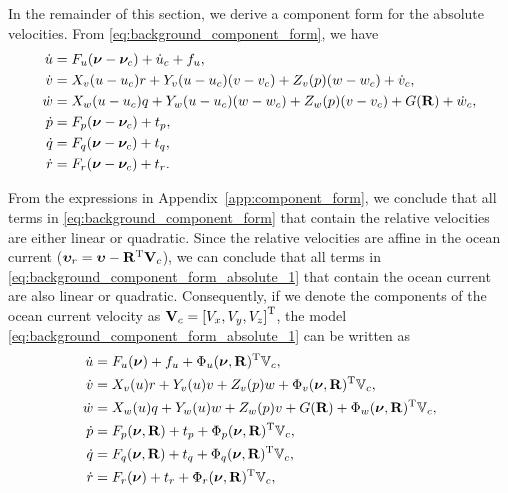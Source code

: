 In the remainder of this section, we derive a component form for the absolute velocities.
From \eqref{eq:background_component_form}, we have
\begin{subequations}
    \begin{align}
        \dot{u} &= F_u(\bm{\nu} - \bm{\nu}_c) + \dot{u}_c + f_u, \\
        \dot{v} &= X_v(u - u_c)r + Y_v(u - u_c)(v - v_c) + Z_v(p)(w - w_c) + \dot{v}_c, \\
        \dot{w} &= X_w(u - u_c)q + Y_w(u - u_c)(w - w_c) + Z_w(p)(v - v_c) + G(\mathbf{R}) + \dot{w}_c, \\
        \dot{p} &= F_p(\bm{\nu} - \bm{\nu}_c) + t_p, \\
        \dot{q} &= F_q(\bm{\nu} - \bm{\nu}_c) + t_q, \\
        \dot{r} &= F_r(\bm{\nu} - \bm{\nu}_c) + t_r.
    \end{align}
    \label{eq:background_component_form_absolute_1}
\end{subequations}%

From the expressions in Appendix~\ref{app:component_form}, we conclude that all terms in \eqref{eq:background_component_form} that contain the relative velocities are either linear or quadratic.
Since the relative velocities are affine in the ocean current ($\bm{\upsilon}_r = \bm{\upsilon} - \mathbf{R}^{\mathrm{T}}\mathbf{V}_c$), we can conclude that all terms in \eqref{eq:background_component_form_absolute_1} that contain the ocean current are also linear or quadratic. 
Consequently, if we denote the components of the ocean current velocity as $\mathbf{V}_c = \left[V_x, V_y, V_z\right]^{\mathrm{T}}$, the model \eqref{eq:background_component_form_absolute_1} can be written as
\begin{subequations}
    \begin{align}
        \dot{u} &= F_u(\bm{\nu}) + f_u + \Phi_u(\bm{\nu}, \mathbf{R})^{\mathrm{T}}\mathbb{V}_c, \\
        \dot{v} &= X_v(u)r + Y_v(u)v + Z_v(p)w + \Phi_v(\bm{\nu}, \mathbf{R})^{\mathrm{T}}\mathbb{V}_c, \\
        \dot{w} &= X_w(u)q + Y_w(u)w + Z_w(p)v + G(\mathbf{R}) + \Phi_w(\bm{\nu}, \mathbf{R})^{\mathrm{T}}\mathbb{V}_c, \\
        \dot{p} &= F_p(\bm{\nu}, \mathbf{R}) + t_p + \Phi_p(\bm{\nu}, \mathbf{R})^{\mathrm{T}}\mathbb{V}_c, \\
        \dot{q} &= F_q(\bm{\nu}, \mathbf{R}) + t_q + \Phi_q(\bm{\nu}, \mathbf{R})^{\mathrm{T}}\mathbb{V}_c, \\
        \dot{r} &= F_r(\bm{\nu}) + t_r + \Phi_r(\bm{\nu}, \mathbf{R})^{\mathrm{T}}\mathbb{V}_c,
    \end{align}
    \label{eq:background_component_form_absolute_2}
\end{subequations}

